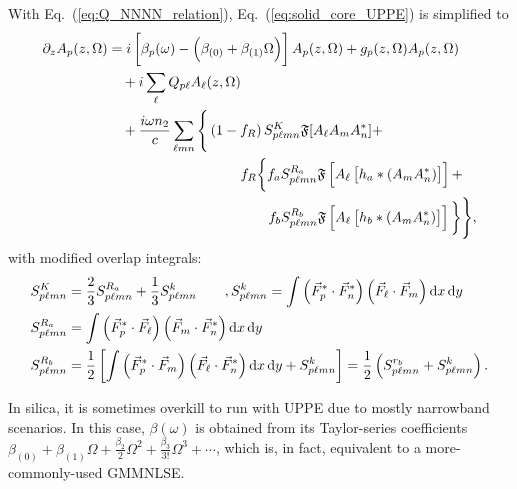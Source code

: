 \documentclass[12pt,hidelinks]{book}
\begin{document}
With Eq.~(\ref{eq:Q_NNNN_relation}), Eq.~(\ref{eq:solid_core_UPPE}) is simplified to
\begin{align}
\partial_zA_p(z,\Omega)& =i\left[\beta_p(\omega)-\left(\beta_{(0)}+\beta_{(1)}\Omega\right)\right]A_p(z,\Omega)+g_p(z,\Omega)A_p(z,\Omega) \nonumber \\
& \hspace{1em}+i\sum_{\ell}Q_{p\ell}A_{\ell}(z,\Omega) \nonumber \\
& \hspace{1em}+\frac{i\omega n_2}{c}\sum_{\ell mn}\Bigg\{\left(1-f_R\right)S^K_{p\ell mn}\mathfrak{F}[A_{\ell}A_mA_n^{\ast}]+ \nonumber \\
& \hspace{9.5em}
f_R\bigg\{f_aS^{R_a}_{p\ell mn}\mathfrak{F}\left[A_{\ell}\left[h_a\ast\left(A_mA_n^{\ast}\right)\right]\right]+ \nonumber \\
& \hspace{11.5em} f_bS^{R_b}_{p\ell mn}\mathfrak{F}\left[A_{\ell}\left[h_b\ast\left(A_mA_n^{\ast}\right)\right]\right]\bigg\}\Bigg\} , \label{eq:solid_core_UPPE_S}
\end{align}
with modified overlap integrals:
\begin{subequations}
\begin{align}
S^K_{p\ell mn} & =\frac{2}{3}S^{R_a}_{p\ell mn}+\frac{1}{3}S^k_{p\ell mn}\qquad,S^k_{p\ell mn}=\int\left(\vec{F}_p^{\ast}\cdot\vec{F}_n^{\ast}\right)\left(\vec{F}_{\ell}\cdot\vec{F}_m\right)\mathop{}\!\mathrm{d} x\mathop{}\!\mathrm{d} y \label{eq:SK} \\
S^{R_a}_{p\ell mn} & =\int\left(\vec{F}_p^{\ast}\cdot\vec{F}_{\ell}\right)\left(\vec{F}_m\cdot\vec{F}_n^{\ast}\right)\mathop{}\!\mathrm{d} x\mathop{}\!\mathrm{d} y \label{eq:SRa} \\
S^{R_b}_{p\ell mn} & =\frac{1}{2}\left[\int\left(\vec{F}_p^{\ast}\cdot\vec{F}_m\right)\left(\vec{F}_{\ell}\cdot\vec{F}_n^{\ast}\right)\mathop{}\!\mathrm{d} x\mathop{}\!\mathrm{d} y+S^k_{p\ell mn}\right]=\frac{1}{2}\left(S^{r_b}_{p\ell mn}+S^k_{p\ell mn}\right). \label{eq:SRb}
\end{align}
\label{eq:S}
\end{subequations}

In silica, it is sometimes overkill to run with UPPE due to mostly narrowband scenarios. In this case, $\beta(\omega)$ is obtained from its Taylor-series coefficients $\beta_{(0)}+\beta_{(1)}\Omega+\frac{\beta_2}{2}\Omega^2+\frac{\beta_3}{3!}\Omega^3+\cdots$, which is, in fact, equivalent to a more-commonly-used GMMNLSE.
\end{document}
